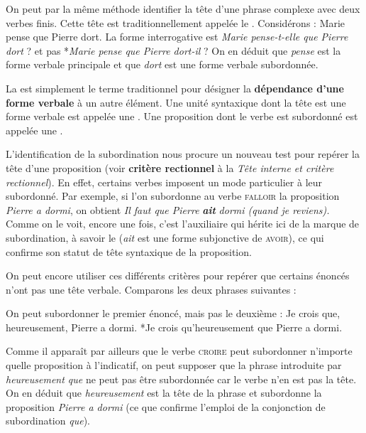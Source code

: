 On peut par la même méthode identifier la tête d’une phrase complexe avec deux verbes finis. Cette tête est traditionnellement appelée le . Considérons :
\ea
{Marie pense que Pierre dort}.
\z
La forme interrogative est \textit{Marie pense-t-elle que Pierre dort} ? et pas *\textit{Marie pense que Pierre dort-il} ? On en déduit que \textit{pense} est la forme verbale principale et que \textit{dort} est une forme verbale subordonnée.

\begin{styleLivreImportant}
La  est simplement le terme traditionnel pour désigner la \textbf{dépendance d’une} \textbf{forme verbale} à un autre élément. Une unité syntaxique dont la tête est une forme verbale est appelée une . Une proposition dont le verbe est subordonné est appelée une .
\end{styleLivreImportant}

L’identification de la subordination nous procure un nouveau test pour repérer la tête d’une proposition (voir \textbf{critère rectionnel} à la  \textit{Tête interne et critère rectionnel}). En effet, certains verbes imposent un mode particulier à leur subordonné. Par exemple, si l’on subordonne au verbe \textsc{falloir} la proposition \textit{Pierre a dormi}, on obtient \textit{Il faut que Pierre} \textbf{\textit{ait}} \textit{dormi (quand je reviens).} Comme on le voit, encore une fois, c’est l’auxiliaire qui hérite ici de la marque de subordination, à savoir le  (\textit{ait} est une forme subjonctive de \textsc{avoir}), ce qui confirme son statut de tête syntaxique de la proposition.

On peut encore utiliser ces différents critères pour repérer que certains énoncés n’ont pas une tête verbale. Comparons les deux phrases suivantes :

\z
{}
\z

On peut subordonner le premier énoncé, mais pas le deuxième :
\ea
{Je crois que, heureusement, Pierre a dormi}.
\z
\ea
*{Je crois qu’heureusement que Pierre a dormi}.
\z

Comme il apparaît par ailleurs que le verbe \textsc{croire} peut subordonner n’importe quelle proposition à l’indicatif, on peut supposer que la phrase introduite par \textit{heureusement que} ne peut pas être subordonnée car le verbe n’en est pas la tête. On en déduit que \textit{heureusement} est la tête de la phrase et subordonne la proposition \textit{Pierre a dormi} (ce que confirme l’emploi de la conjonction de subordination \textit{que}).

